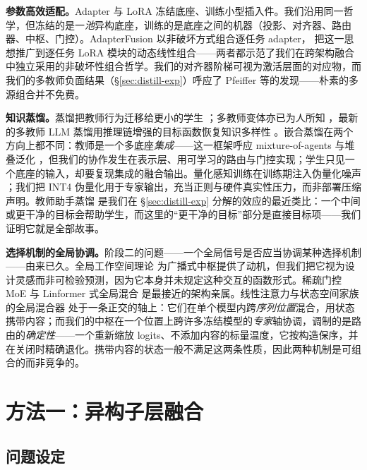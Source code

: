 \documentclass[10pt,twoside]{article}
\theoremstyle{definition}
\theoremstyle{plain}
\theoremstyle{remark}
\begin{document}
\textbf{参数高效适配。}Adapter \citep{houlsby2019} 与 LoRA \citep{hu2022} 冻结底座、训练小型插入件。我们沿用同一哲学，但冻结的是一\emph{池}异构底座，训练的是底座之间的机器（投影、对齐器、路由器、中枢、门控）。AdapterFusion \citep{pfeiffer2021} 以非破坏方式组合逐任务 adapter，\citet{huang2024lorahub} 把这一思想推广到逐任务 LoRA 模块的动态线性组合——两者都示范了我们在跨架构融合中独立采用的非破坏性组合哲学。我们的对齐器阶梯可视为激活层面的对应物，而我们的多教师负面结果（\S\ref{sec:distill-exp}）呼应了 Pfeiffer 等的发现——朴素的多源组合并不免费。

\textbf{知识蒸馏。}蒸馏把教师行为迁移给更小的学生 \citep{hintonDistillingKnowledgeNeural2015,sanh2019,gou2021}；多教师变体亦已为人所知 \citep{you2017}，最新的多教师 LLM 蒸馏用推理链增强的目标函数恢复知识多样性 \citep{tian2025tinyllm}。嵌合蒸馏在两个方向上都不同：教师是一个多底座\emph{集成}——这一框架呼应 mixture-of-agents \citep{wang2024moa} 与堆叠泛化 \citep{wolpertStackedGeneralization1992}，但我们的协作发生在表示层、用可学习的路由与门控实现；学生只见一个底座的输入，却要复现集成的融合输出。量化感知训练在训练期注入伪量化噪声 \citep{dettmers2022}；我们把 INT4 伪量化用于专家输出，充当正则与硬件真实性压力，而非部署压缩声明。教师助手蒸馏 \citep{mirzadeh2020} 是我们在 \S\ref{sec:distill-exp} 分解的效应的最近类比：一个中间或更干净的目标会帮助学生，而这里的``更干净的目标''部分是直接目标项——我们证明它就是全部故事。

\textbf{选择机制的全局协调。}阶段二的问题——一个全局信号是否应当协调某种选择机制——由来已久。全局工作空间理论 \citep{baarsCognitiveTheoryConsciousness1988} 为广播式中枢提供了动机，但我们把它视为设计灵感而非可检验预测，因为它本身并未规定这种交互的函数形式。稀疏门控 MoE \citep{shazeerOutrageouslyLargeNeural2017} 与 Linformer 式全局混合 \citep{wangLinformerSelfAttentionLinear2020} 是最接近的架构亲属。线性注意力与状态空间家族的全局混合器 \citep{katharopoulos2020,gu2022s4,gu2023mamba} 处于一条正交的轴上：它们在单个模型内跨\emph{序列位置}混合，用状态携带内容；而我们的中枢在一个位置上跨许多冻结模型的\emph{专家}轴协调，调制的是路由的\emph{确定性}——一个重新缩放 logits、不添加内容的标量温度，它按构造保序，并在关闭时精确退化。携带内容的状态一般不满足这两条性质，因此两种机制是可组合的而非竞争的。

\section{方法一：异构子层融合}
\label{sec:method}

\subsection{问题设定}
\label{sec:setup}
\end{document}
